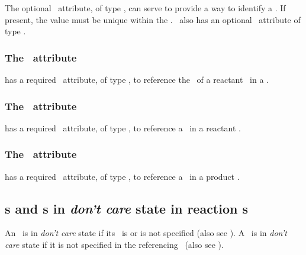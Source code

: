 The optional \idAtt\ attribute, of type \SIdPT, can serve to provide a way to identify \mBlockChangedBegin{\revTwentyTwentyMarch}a\mBlockChangedEnd{\revTwentyTwentyMarch} \speciesTypeComponentMapInProduct. If present, the value must be unique within the \reaction. \SpeciesTypeComponentMapInProduct\ also has an optional \nameAtt\ attribute of type \stringPT.

\subsubsection{The \reactantAtt\ attribute}
\label{def:SpeciesTypeComponentMapInProduct:reactant}

 has a required \reactantAtt\ attribute, of type \SIdRefPT, to reference the  \idAtt\ of a reactant \speciesReference\ in a \reaction.

\subsubsection{The \reactantComponentAtt\ attribute}
\label{def:SpeciesTypeComponentMapInProduct:reactantComponent}

 has a required \reactantComponentAtt\ attribute, of type \SIdRefPT, to reference a \componentWR\ in a reactant \species. 

\subsubsection{The \productComponentAtt\ attribute}
\label{def:SpeciesTypeComponentMapInProduct:productComponent}

 has a required \productComponentAtt\ attribute, of type \SIdRefPT, to reference a \componentWR\ in a product \species. 

\subsection{s and \speciesFeature s in \emph{don't care} state in reaction \product s}
\label{def:Reaction:dontcaredontchange}

An \outwardBindingSite\ is in \emph{don't care} state if its \bindingStatusAtt\ is  or is not specified (also see ). A \speciesFeature\ is in \emph{don't care} state if it is not specified in the referencing \species\ (also see ). 

